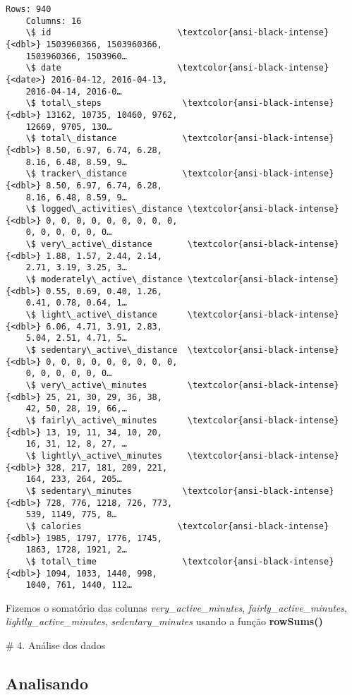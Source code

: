 \documentclass[11pt]{article}
\begin{document}
\begin{Verbatim}[commandchars=\\\{\}]
    Rows: 940
    Columns: 16
    \$ id                         \textcolor{ansi-black-intense}{<dbl>} 1503960366, 1503960366,
    1503960366, 1503960…
    \$ date                       \textcolor{ansi-black-intense}{<date>} 2016-04-12, 2016-04-13,
    2016-04-14, 2016-0…
    \$ total\_steps                \textcolor{ansi-black-intense}{<dbl>} 13162, 10735, 10460, 9762,
    12669, 9705, 130…
    \$ total\_distance             \textcolor{ansi-black-intense}{<dbl>} 8.50, 6.97, 6.74, 6.28,
    8.16, 6.48, 8.59, 9…
    \$ tracker\_distance           \textcolor{ansi-black-intense}{<dbl>} 8.50, 6.97, 6.74, 6.28,
    8.16, 6.48, 8.59, 9…
    \$ logged\_activities\_distance \textcolor{ansi-black-intense}{<dbl>} 0, 0, 0, 0, 0, 0, 0, 0, 0,
    0, 0, 0, 0, 0, 0…
    \$ very\_active\_distance       \textcolor{ansi-black-intense}{<dbl>} 1.88, 1.57, 2.44, 2.14,
    2.71, 3.19, 3.25, 3…
    \$ moderately\_active\_distance \textcolor{ansi-black-intense}{<dbl>} 0.55, 0.69, 0.40, 1.26,
    0.41, 0.78, 0.64, 1…
    \$ light\_active\_distance      \textcolor{ansi-black-intense}{<dbl>} 6.06, 4.71, 3.91, 2.83,
    5.04, 2.51, 4.71, 5…
    \$ sedentary\_active\_distance  \textcolor{ansi-black-intense}{<dbl>} 0, 0, 0, 0, 0, 0, 0, 0, 0,
    0, 0, 0, 0, 0, 0…
    \$ very\_active\_minutes        \textcolor{ansi-black-intense}{<dbl>} 25, 21, 30, 29, 36, 38,
    42, 50, 28, 19, 66,…
    \$ fairly\_active\_minutes      \textcolor{ansi-black-intense}{<dbl>} 13, 19, 11, 34, 10, 20,
    16, 31, 12, 8, 27, …
    \$ lightly\_active\_minutes     \textcolor{ansi-black-intense}{<dbl>} 328, 217, 181, 209, 221,
    164, 233, 264, 205…
    \$ sedentary\_minutes          \textcolor{ansi-black-intense}{<dbl>} 728, 776, 1218, 726, 773,
    539, 1149, 775, 8…
    \$ calories                   \textcolor{ansi-black-intense}{<dbl>} 1985, 1797, 1776, 1745,
    1863, 1728, 1921, 2…
    \$ total\_time                 \textcolor{ansi-black-intense}{<dbl>} 1094, 1033, 1440, 998,
    1040, 761, 1440, 112…
\end{Verbatim}

Fizemos o somatório das colunas \emph{very\_active\_minutes},
\emph{fairly\_active\_minutes}, \emph{lightly\_active\_minutes},
\emph{sedentary\_minutes} usando a função \textbf{rowSums()}

\# 4. Análise dos dados

\hypertarget{analisando}{%
    \subsection{Analisando}\label{analisando}}
\end{document}
